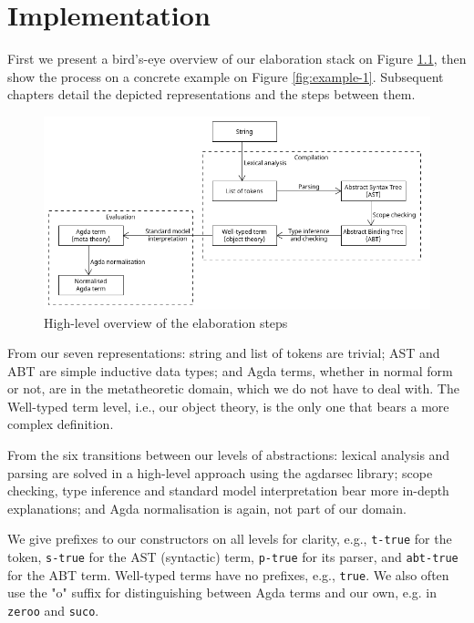 \chapter{Implementation}
\label{ch:Implementation}

First we present a bird's-eye overview of our elaboration stack on Figure \ref{fig:architecture}, then show the process on a concrete example on Figure \ref{fig:example-1}. Subsequent chapters detail the depicted representations and the steps between them.

\begin{figure}[h!]
	\centering
	\includegraphics[width=1.0\textwidth]{../images/architecture.png}
	\caption{High-level overview of the elaboration steps}
	\label{fig:architecture}
\end{figure}

From our seven representations: string and list of tokens are trivial; AST and ABT are simple inductive data types; and Agda terms, whether in normal form or not, are in the metatheoretic domain, which we do not have to deal with. The Well-typed term level, i.e., our object theory, is the only one that bears a more complex definition.

From the six transitions between our levels of abstractions: lexical analysis and parsing are solved in a high-level approach using the agdarsec library; scope checking, type inference and standard model interpretation bear more in-depth explanations; and Agda normalisation is again, not part of our domain.

We give prefixes to our constructors on all levels for clarity, e.g., \verb$t-true$ for the token, \verb$s-true$ for the AST (syntactic) term, \verb$p-true$ for its parser, and \verb$abt-true$ for the ABT term. Well-typed terms have no prefixes, e.g., \verb$true$. We also often use the "o" suffix for distinguishing between Agda terms and our own, e.g. in \verb$zeroo$ and \verb$suco$.

